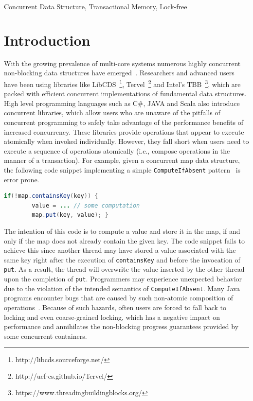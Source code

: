 \documentclass[10pt,conference,compsocconf]{IEEEtran}
\begin{document}
\begin{IEEEkeywords}
    Concurrent Data Structure, Transactional Memory, Lock-free 
\end{IEEEkeywords}


\section{Introduction}
\label{sec:intro}
With the growing prevalence of multi-core systems numerous highly concurrent non-blocking data structures have emerged~\cite{linden2013skiplist,ellen2010non,braginsky2012lock,zhang2015lockfree,michael2002high}.
Researchers and advanced users have been using libraries like LibCDS~\footnote{http://libcds.sourceforge.net/}, Tervel~\footnote{http://ucf-cs.github.io/Tervel/} and Intel's TBB~\footnote{https://www.threadingbuildingblocks.org/}, which are packed with efficient concurrent implementations of fundamental data structures.
High level programming languages such as C\#, JAVA and Scala also introduce concurrent libraries, which allow users who are unaware of the pitfalls of concurrent programming to safely take advantage of the performance benefits of increased concurrency.
These libraries provide operations that appear to execute atomically when invoked individually.
However, they fall short when users need to execute a sequence of operations atomically (i.e., compose operations in the manner of a transaction).
For example, given a concurrent map data structure, the following code snippet implementing a simple \texttt{ComputeIfAbsent} pattern~\cite{golan2013concurrent} is error prone.
\begin{lstlisting}[basicstyle=\small,language=JAVA]
    if(!map.containsKey(key)) {
        value = ... // some computation
        map.put(key, value); }
\end{lstlisting}
The intention of this code is to compute a value and store it in the map, if and only if the map does not already contain the given key.
The code snippet fails to achieve this since another thread may have stored a value associated with the same key right after the execution of \texttt{containsKey} and before the invocation of \texttt{put}.
As a result, the thread will overwrite the value inserted by the other thread upon the completion of \texttt{put}.
Programmers may experience unexpected behavior due to the violation of the intended semantics of \texttt{ComputeIfAbsent}.
Many Java programs encounter bugs that are caused by such non-atomic composition of operations~\cite{shacham2011testing}.
Because of such hazards, often users are forced to fall back to locking and even coarse-grained locking, which has a negative impact on performance and annihilates the non-blocking progress guarantees provided by some concurrent containers.
\end{document}
